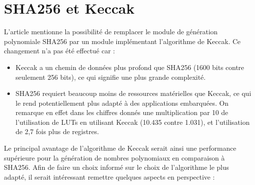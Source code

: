 \documentclass[10pt,a4paper]{article}
\begin{document}
\section{SHA256 et Keccak}
L'article mentionne la possibilité de remplacer le module de génération polynomiale SHA256 par un module implémentant l'algorithme de Keccak. Ce 
changement n'a pas été effectué car :
\begin{itemize}
    \item Keccak a un chemin de données plus profond que SHA256 (1600 bits contre seulement 256 bits), ce qui signifie une plus grande complexité.
    \item SHA256 requiert beaucoup moins de ressources matérielles que Keccak, ce qui le rend potentiellement plus adapté à des applications embarquées. 
On remarque en effet dans les chiffres donnés une multiplication par 10 de l'utilisation de LUTs en utilisant Keccak (10.435 contre 1.031), et l'utilisation 
de 2,7 fois plus de registres.
\end{itemize} 
Le principal avantage de l'algorithme de Keccak serait ainsi une performance supérieure pour la génération de nombres polynomiaux en 
comparaison à SHA256. Afin de faire un choix informé sur le choix de l'algorithme le plus adapté, il serait intéressant remettre quelques 
aspects en perspective :
\end{document}
